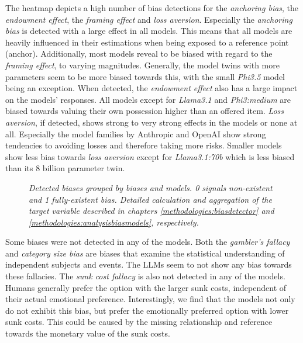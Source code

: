 \par The heatmap depicts a high number of bias detections for the \textit{anchoring bias}, the \textit{endowment effect}, the \textit{framing effect} and \textit{loss aversion}. Especially the \textit{anchoring bias} is detected with a large effect in all models. This means that all models are heavily influenced in their estimations when being exposed to a reference point (anchor). Additionally, most models reveal to be biased with regard to the \textit{framing effect}, to varying magnitudes. Generally, the model twins with more parameters seem to be more biased towards this, with the small \textit{Phi3.5} model being an exception. When detected, the \textit{endowment effect} also has a large impact on the models' responses. All models except for \textit{Llama3.1} and \textit{Phi3:medium} are biased towards valuing their own possession higher than an offered item. \textit{Loss aversion}, if detected, shows strong to very strong effects in the models or none at all. Especially the model families by Anthropic and OpenAI show strong tendencies to avoiding losses and therefore taking more risks. Smaller models show less bias towards \textit{loss aversion} except for \textit{Llama3.1:70b} which is less biased than its 8 billion parameter twin.

\begin{figure}[htbp]
    \centering
    
    \caption[Heatmap of bias detections grouped by biases and models]{\centering \textit{Detected biases grouped by biases and models. 0 signals non-existent and 1 fully-existent bias. Detailed calculation and aggregation of the target variable described in chapters \ref{methodologies:biasdetector} and \ref{methodologies:analysisbiasmodels}, respectively.}}
    \label{fig:detections-heatmap}
\end{figure}

\par Some biases were not detected in any of the models. Both the \textit{gambler's fallacy} and \textit{category size bias} are biases that examine the statistical understanding of independent subjects and events. The LLMs seem to not show any bias towards these fallacies. The \textit{sunk cost fallacy} is also not detected in any of the models. Humans generally prefer the option with the larger sunk costs, independent of their actual emotional preference. Interestingly, we find that the models not only do not exhibit this bias, but prefer the emotionally preferred option with lower sunk costs. This could be caused by the missing relationship and reference towards the monetary value of the sunk costs.

